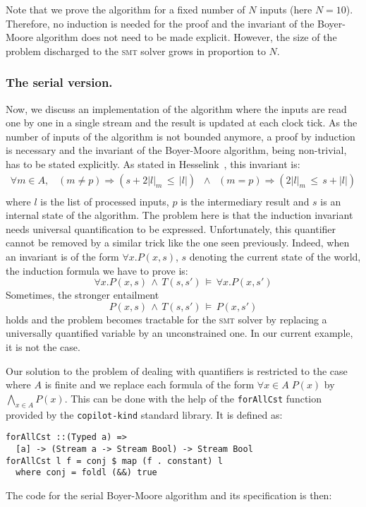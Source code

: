Note that we prove the algorithm for a fixed number of $N$ inputs
(here $N=10$). Therefore, no induction is needed for the proof and the
invariant of the Boyer-Moore algorithm does not need to be made explicit. However, the size of the problem discharged to the \textsc{smt} solver grows in proportion to $N$.


\subsubsection{The serial version.} Now, we discuss an implementation
of the algorithm where the inputs are read one by one in a single
stream and the result is updated at each clock tick. As the number of
inputs of the algorithm is not bounded anymore, a proof by induction
is necessary and the invariant of the Boyer-Moore algorithm, being
non-trivial, has to be stated explicitly. As stated in
Hesselink~\cite{Hesselink2005}, this invariant is:
\[ \begin{array}{c}
\forall m \in A, \;\;\; \left(m \neq p\right) \Longrightarrow \left( s + 2|l|_m \,\leq\, |l| \right) \;\; \wedge \;\; \left(m = p\right) \Longrightarrow \left( 2|l|_m \,\leq\, s + |l| \right)
\\

\end{array} \]
where $l$ is the list of processed inputs, $p$ is the intermediary result and $s$ is an internal state of the algorithm. The problem here is that the induction invariant needs universal quantification to be expressed. Unfortunately, this quantifier cannot be removed by a similar trick like the one seen previously. Indeed, when an invariant is of the form $\forall x. P(x, s)$, $s$ denoting the current state of the world, the induction formula we have to prove is:
\[ \forall x. P(x, s) \,\wedge\, T\left(s, s' \right) \,\models\, \forall x. P(x, s') \]
Sometimes, the stronger entailment 
\[ P(x, s) \,\wedge\, T\left(s, s' \right) \,\models\, P(x, s') \]
holds and the problem becomes tractable for the \textsc{smt} solver by replacing a universally quantified variable by an unconstrained one. In our current example, it is not the case. 


Our solution to the problem of dealing with quantifiers is restricted to the
case where $A$ is finite and we replace each formula of the form $\forall x \in A
\; P(x)$ by $\bigwedge_{x \in A} P(x)$. This can be done with the help of the
\texttt{forAllCst} function provided by the \texttt{copilot-kind} standard library. It is
defined as:
\begin{lstlisting}[frame=single, deletekeywords={conj}]
forAllCst ::(Typed a) => 
  [a] -> (Stream a -> Stream Bool) -> Stream Bool
forAllCst l f = conj $ map (f . constant) l
  where conj = foldl (&&) true
\end{lstlisting}
The code for the serial Boyer-Moore algorithm and its specification is then:

